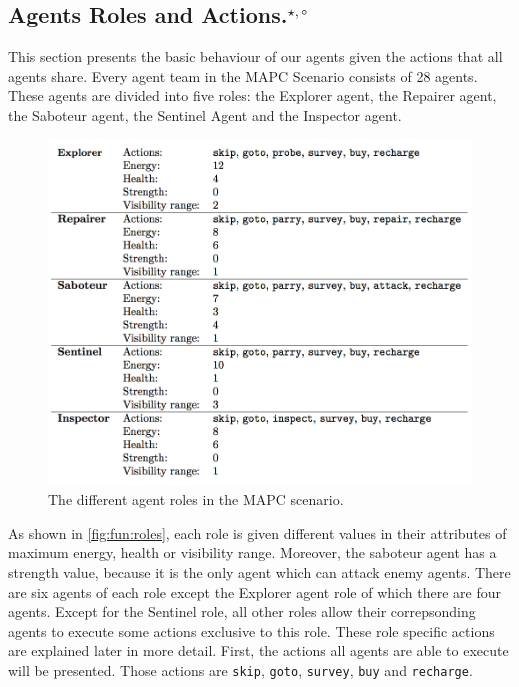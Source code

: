 \subsection[Agent Roles and Actions]{Agents Roles and Actions.$^{\star,\circ}$}\label{fun:mapc_roles}
This section presents the basic behaviour of our agents given the actions that all agents share.
Every agent team in the MAPC Scenario consists of 28 agents.
These agents are divided into five roles: the Explorer agent, the Repairer agent, the Saboteur agent, the Sentinel Agent and the Inspector agent.
\begin{figure}[ht]
  \centering
  \includegraphics[width=0.9\linewidth]{images/roles.png}
  \caption{The different agent roles in the MAPC scenario.}
  \label{fig:fun:roles}
\end{figure}
As shown in \autoref{fig:fun:roles}, each role is given different values in their attributes of maximum energy, health or visibility range.
Moreover, the saboteur agent has a strength value, because it is the only agent which can attack enemy agents.
There are six agents of each role except the Explorer agent role of which there are four agents.
Except for the Sentinel role, all other roles allow their correpsonding agents to execute some actions exclusive to this role.
These role specific actions are explained later in more detail.
First, the actions all agents are able to execute will be presented.
Those actions are \texttt{skip}, \texttt{goto}, \texttt{survey}, \texttt{buy} and \texttt{recharge}.
